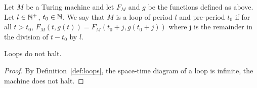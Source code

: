 







\begin{definition}[Loops]\label{def:loops}
    Let $M$ be a Turing machine and let $F_M$ and $g$ be the functions defined as above. Let $l \in \mathbb{N}^+$, $t_0 \in \mathbb{N}$.
    We say that $M$ is a loop of period $l$ and pre-period $t_0$ if for all $t > t_0$, $F_M(t,g(t)) = F_M(t_0 + j,g(t_0 + j))$ where j is the remainder in the division of $t - t_0$ by $l$.
\end{definition}

\begin{lemma}\label{lem:loopdonthalt}
    Loops do not halt.
\end{lemma}
\begin{proof} By Definition~\ref{def:loops}, the space-time diagram of a loop is infinite, the machine does not halt.
\end{proof}

